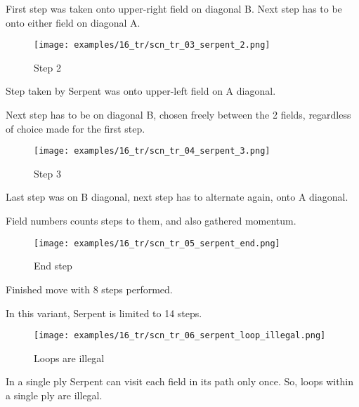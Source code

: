 First step was taken onto upper-right field on diagonal B.
Next step has to be onto either field on diagonal A.

\vspace*{0.125\textheight}
\noindent
\begin{wrapfigure}[9]{l}{0.4\textwidth} %
\centering
\texttt{[image: examples/16\_tr/scn\_tr\_03\_serpent\_2.png]}
\caption{Step 2}
\label{fig:scn_tr_03_serpent_2}
\end{wrapfigure}
Step taken by Serpent was onto upper-left field on A diagonal.

Next step has to be on diagonal B, chosen freely between the 2 fields,
regardless of choice made for the first step.

\clearpage %

\vspace*{-1.2\baselineskip}
\noindent
\begin{wrapfigure}[6]{l}{0.4\textwidth}
\centering
\texttt{[image: examples/16\_tr/scn\_tr\_04\_serpent\_3.png]}
\vspace*{-0.5\baselineskip}
\caption{Step 3}
\label{fig:scn_tr_04_serpent_3}
\end{wrapfigure}
Last step was on B diagonal, next step has to alternate again, onto A diagonal.

Field numbers counts steps to them, and also gathered momentum.

\vspace*{2.7\baselineskip}
\noindent
\begin{wrapfigure}[4]{l}{0.4\textwidth}
\centering
\texttt{[image: examples/16\_tr/scn\_tr\_05\_serpent\_end.png]}
\vspace*{-0.5\baselineskip}
\caption{End step}
\label{fig:scn_tr_05_serpent_end}
\end{wrapfigure}
Finished move with 8 steps performed.

In this variant, Serpent is limited to 14 steps.

\vspace*{4.7\baselineskip}
\noindent
\begin{wrapfigure}[9]{l}{0.4\textwidth}
\centering
\texttt{[image: examples/16\_tr/scn\_tr\_06\_serpent\_loop\_illegal.png]}
\vspace*{-0.5\baselineskip}
\caption{Loops are illegal}
\label{fig:scn_tr_06_serpent_loop_illegal}
\end{wrapfigure}
In a single ply Serpent can visit each field in its path only once.
So, loops within a single ply are illegal.


